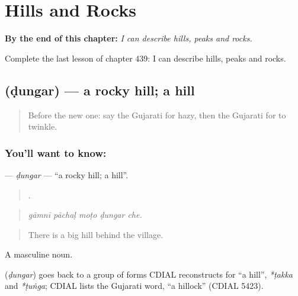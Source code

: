 
\chapter{Hills and Rocks}
\label{ch:gu-hills-and-rocks}

\begin{chapteropening}
\textbf{By the end of this chapter:} \emph{I can describe hills, peaks and rocks.}

Complete the last lesson of chapter 439: I can describe hills, peaks and rocks.
\end{chapteropening}

\section[\texorpdfstring{\gu{ડુંગર} (ḍungar)}{ડુંગર (ḍungar)}]{ (ḍungar) — a rocky hill; a hill}

\label{lesson:GU-C439-dungar}



\begin{quote}
Before the new one: say the Gujarati for hazy, then the Gujarati for to twinkle.
\end{quote}

\subsection*{You'll want to know: }
\textbf{} — \emph{ḍungar} — \textquotedblleft{}a rocky hill; a hill\textquotedblright{}.

\begin{quote}
    .
\end{quote}

\begin{quote}
\emph{gāmnī pāchaḷ moṭo ḍungar che.}
\end{quote}

\begin{quote}
There is a big hill behind the village.
\end{quote}

A masculine noun.

\begin{cousinweb}
\textbf{} (\emph{ḍungar}) goes back to a group of forms CDIAL reconstructs for \textquotedblleft{}a hill\textquotedblright{}, \emph{*ṭakka} and \emph{*ṭuṅga}; CDIAL lists the Gujarati word, \textquotedblleft{}a hillock\textquotedblright{} (CDIAL 5423).
\end{cousinweb}

